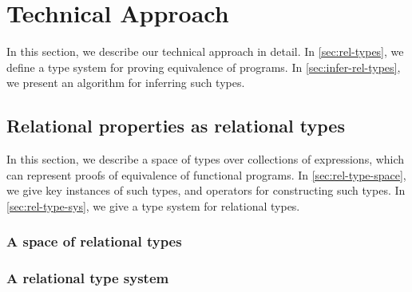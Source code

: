 \section{Technical Approach}
%
In this section, we describe our technical approach in detail.
%
In \autoref{sec:rel-types}, we define a type system for proving
equivalence of programs.
%
In \autoref{sec:infer-rel-types}, we present an algorithm for
inferring such types.

\subsection{Relational properties as relational types}
\label{sec:rel-types}
%
In this section, we describe a space of types over collections of
expressions, which can represent proofs of equivalence of functional
programs.
%
In \autoref{sec:rel-type-space}, we give key instances of such types,
and operators for constructing such types.
%
In \autoref{sec:rel-type-sys}, we give a type system for relational
types.

\subsubsection{A space of relational types}
\label{sec:rel-type-space}








\subsubsection{A relational type system}
\label{sec:rel-type-sys}

